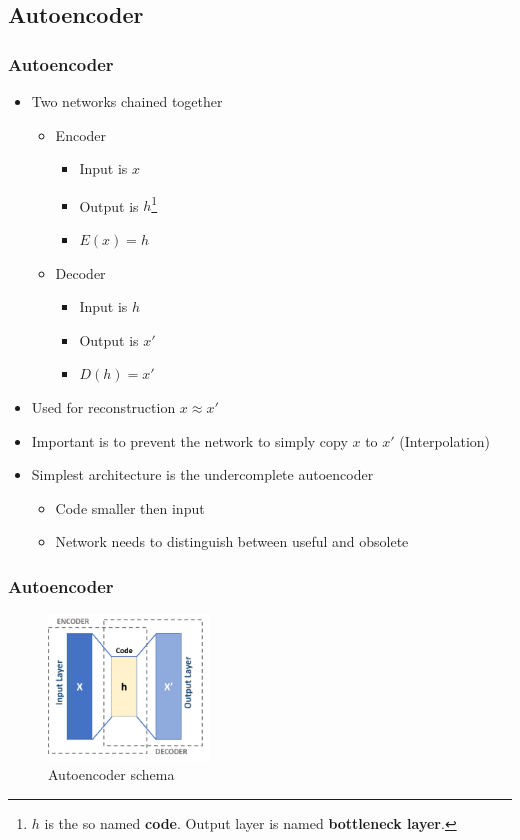  \subsection{Autoencoder}
  \begin{frame}
   \frametitle{Autoencoder}
   
   \begin{itemize}
    \item<1-> Two networks chained together
    \begin{itemize}
     \item<2-> Encoder
      \begin{itemize}
       \item<3-> Input is $x$
       \item<4-> Output is $h$\footnote{$h$ is the so named \textbf{code}. Output layer is named \textbf{bottleneck layer}.}
       \item<5-> $E(x) = h$
      \end{itemize}
     \item<6-> Decoder
     \begin{itemize}
      \item<7-> Input is $h$
      \item<8-> Output is $x\prime$
      \item<9-> $D(h) = x\prime$
     \end{itemize}
    \end{itemize}
    \item<10-> Used for reconstruction $x \approx x\prime$
    \item<11-> Important is to prevent the network to simply copy $x$ to $x\prime$ (Interpolation)
    \item<12-> Simplest architecture is the undercomplete autoencoder
    \begin{itemize}
     \item<13-> Code smaller then input
     \item<14-> Network needs to distinguish between useful and obsolete
    \end{itemize}
   \end{itemize}
  
  \end{frame}
  \begin{frame}
   \frametitle{Autoencoder}
   
   \begin{figure}[H]
    \includegraphics[width=0.38\textwidth]{../Images/autoencoder_schema.png}
    \centering
    \caption{Autoencoder schema \cite{wiki2019}}
    \label{fig:lstm_architecture}
   \end{figure}
   
  \end{frame}
 
